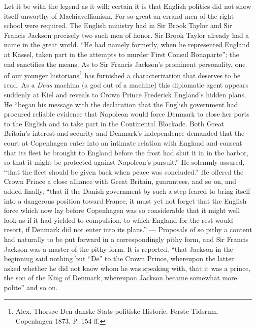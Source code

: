 \documentclass[12pt,a4paper,openany]{book}
\newcommand{\opage}[1]{\marginnote{\footnotesize\textit{[#1]}}}
\begin{document}
\setcounter{footnote}{0}%
\opage{98}Let it be with the legend as it will; certain it is that
English politics did not show itself unworthy of Machiavellianism.
For so great an errand men of the right school
were required. The English ministry had in
Sir Brook Taylor and Sir Francis Jackson precisely two such
men of honor. Sir Brook Taylor already had
a name in the great world. ``He had namely formerly,
when he represented England at Kassel, taken part
in the attempts to murder First Consul Bonaparte'';
the end sanctifies the means. As to Sir Francis
Jackson's prominent personality, one of
our younger historians\footnote{Alex. Thorsøe Den danske Stats politiske Historie. Første Tidsrum. Copenhagen 1873. P. 154 ff.} has furnished a characterization that
deserves to be read. As a \emph{Deus} machina (a god out of %
a machine) this diplomatic agent appears suddenly
at Kiel and reveals to Crown Prince Frederick England's
hidden plans. He ``began his message with
the declaration that the English government had procured
reliable evidence that Napoleon
would force Denmark to close her ports to the English
and to take part in the Continental Blockade.
Both Great Britain's interest and security and
Denmark's independence demanded that the court at Copenhagen
enter into an intimate relation with England and consent
that its fleet be brought to England before
the frost had shut it in in the harbor, so that it
might be protected against Napoleon's pursuit.''
He solemnly assured, ``that the fleet should be
given back when peace was concluded.'' He offered
the Crown Prince a close alliance with Great Britain,
\setcounter{footnote}{0}%
\opage{99}guarantees, and so on, and added finally, ``that if the
Danish government by such a step feared to
bring itself into a dangerous position toward France, it
must yet not forget that the English force
which now lay before Copenhagen was so considerable that it
might well look as if it had yielded to
compulsion, to which England for the rest would resort, if Denmark
did not enter into its plans.'' --- Proposals of so
pithy a content had naturally to be put forward in a
correspondingly pithy form, and Sir Francis Jackson was a
master of the pithy form. It is reported, ``that Jackson
in the beginning said nothing but ``De'' to the Crown Prince,
whereupon the latter asked whether he did not know
whom he was speaking with, that it was a prince,
the son of the King of Denmark, whereupon Jackson became somewhat
more polite'' and so on.
\end{document}
